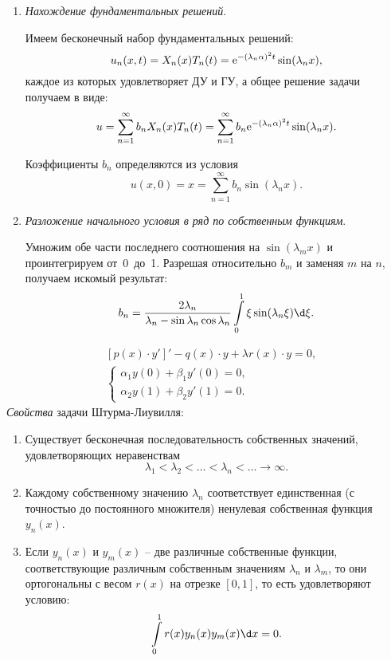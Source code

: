 \begin{enumerate}
    \item \emph{Нахождение фундаментальных решений}.
    
    Имеем бесконечный набор фундаментальных решений:
    \[
        u_n(x, t) = X_n(x)T_n(t) = \mathrm{e}^{-(\lambda_n\alpha)^2t}\sin(\lambda_nx),
    \]
    каждое из которых удовлетворяет ДУ и ГУ, а общее решение задачи получаем в
    виде:
    \[
        u = \sum\limits_{n=1}^\infty b_nX_n(x)T_n(t) = \sum\limits_{n=1}^\infty
        b_n\mathrm{e}^{-(\lambda_n\alpha)^2t}\sin(\lambda_nx).
    \]
    
    Коэффициенты \( b_n \) определяются из условия
    \[
        u(x, 0) = x = \sum\limits_{n=1}^\infty b_n\sin(\lambda_nx).
    \]
    
    \item \emph{Разложение начального условия в ряд по собственным функциям}.
    
    Умножим обе части последнего соотношения на \( \sin(\lambda_mx) \) и
    проинтегрируем от~0~до~1. Разрешая относительно \( b_m \) и заменяя \( m \)
    на \( n \), получаем искомый результат:
    \[
        b_n = \frac{2\lambda_n}{\lambda_n - \sin\lambda_n\cos\lambda_n}
        \int\limits_0^1 \xi\sin(\lambda_n\xi)\d\xi.
    \]
\end{enumerate}

\begin{multicols}{2}
\vspace*{-4em}
\begin{align*}
    & [p(x)\cdot y']' - q(x)\cdot y + \lambda r(x)\cdot y = 0 ,\\
    & \left\{ \begin{array}{l}
        \alpha_1 y(0) + \beta_1 y'(0) = 0, \\
        \alpha_2 y(1) + \beta_2 y'(1) = 0.
    \end{array} \right.
\end{align*}
\emph{Свойства} задачи Штурма-Лиувилля:
\begin{enumerate}
    \item Существует бесконечная последовательность собственных значений,
    удовлетворяющих неравенствам
    \[
        \lambda_1 < \lambda_2 < \ldots < \lambda_n < \ldots \to \infty.
    \]
    \item Каждому собственному значению \( \lambda_n \) соответствует
    единственная (с точностью до постоянного множителя) ненулевая собственная
    функция \( y_n(x) \). 
    \item Если \( y_n(x) \) и \( y_m(x) \) -- две различные собственные функции,
    соответствующие различным собственным значениям \( \lambda_n \) и
    \( \lambda_m \), то они ортогональны с весом \( r(x) \) на отрезке
    \( [0, 1] \), то есть удовлетворяют условию:
    \[
        \int\limits_0^1 r(x)y_n(x)y_m(x)\d x = 0.
    \]
\end{enumerate}
\end{multicols}

\newpage
